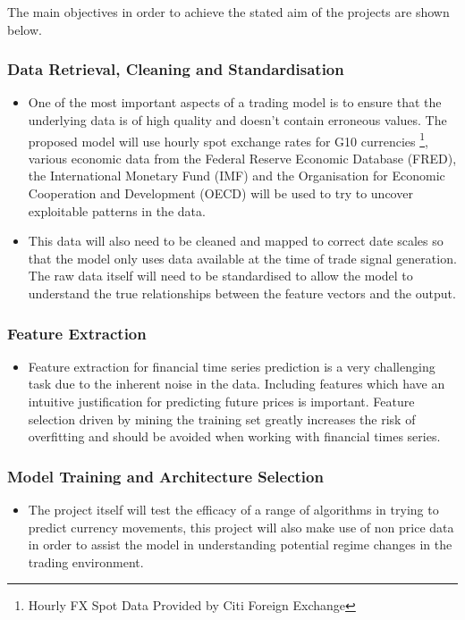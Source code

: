 \documentclass[11pt]{article}
\begin{document}
The main objectives in order to achieve the stated aim of the projects are shown below.

\subsubsection{Data Retrieval, Cleaning and Standardisation}
\begin{itemize}
\item One of the most important aspects of a trading model is to ensure that the underlying data is of high quality and doesn't contain erroneous values. The proposed model will use hourly spot exchange rates for G10 currencies \footnote{Hourly FX Spot Data Provided by Citi Foreign Exchange}, various economic data from the Federal Reserve Economic Database (FRED), the International Monetary Fund (IMF) and the Organisation for Economic Cooperation and Development (OECD) will be used to try to uncover exploitable patterns in the data. 
\item This data will also need to be cleaned and mapped to correct date scales so that the model only uses data available at the time of trade signal generation. The raw data itself will need to be standardised to allow the model to understand the true relationships between the feature vectors and the output.
\end{itemize}
 \subsubsection{Feature Extraction}
	\begin{itemize}
	\item Feature extraction for financial time series prediction is a very challenging task due to the inherent noise in the data. Including features which have an intuitive justification for predicting future prices is important\cite{Arnott2018}. Feature selection driven by mining the training set greatly increases the risk of overfitting and should be avoided when working with financial times series. 
	\end{itemize}
 \subsubsection{Model Training and Architecture Selection}
	\begin{itemize}
	\item The project itself will test the efficacy of a range of algorithms in trying to predict currency movements, this project will also make use of non price data in order to assist the model in understanding potential regime changes in the trading environment. 
	\end{itemize}
\end{document}
